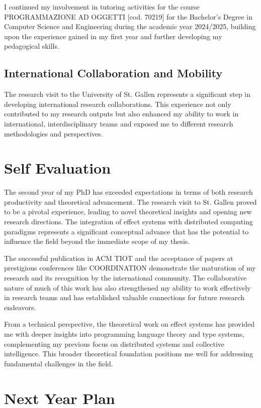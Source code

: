 \documentclass[runningheads]{llncs}
\begin{document}
I continued my involvement in tutoring activities for the course PROGRAMMAZIONE AD OGGETTI [cod. 70219] for the Bachelor's Degree in Computer Science and Engineering during the academic year 2024/2025, building upon the experience gained in my first year and further developing my pedagogical skills.

\subsection{International Collaboration and Mobility}

The research visit to the University of St. Gallen represents a significant step in developing international research collaborations. This experience not only contributed to my research outputs but also enhanced my ability to work in international, interdisciplinary teams and exposed me to different research methodologies and perspectives.

\section{Self Evaluation}

The second year of my PhD has exceeded expectations in terms of both research productivity and theoretical advancement. The research visit to St. Gallen proved to be a pivotal experience, leading to novel theoretical insights and opening new research directions. The integration of effect systems with distributed computing paradigms represents a significant conceptual advance that has the potential to influence the field beyond the immediate scope of my thesis.

The successful publication in ACM TIOT and the acceptance of papers at prestigious conferences like COORDINATION demonstrate the maturation of my research and its recognition by the international community. The collaborative nature of much of this work has also strengthened my ability to work effectively in research teams and has established valuable connections for future research endeavors.

From a technical perspective, the theoretical work on effect systems has provided me with deeper insights into programming language theory and type systems, complementing my previous focus on distributed systems and collective intelligence. This broader theoretical foundation positions me well for addressing fundamental challenges in the field.

\section{Next Year Plan}
\end{document}
